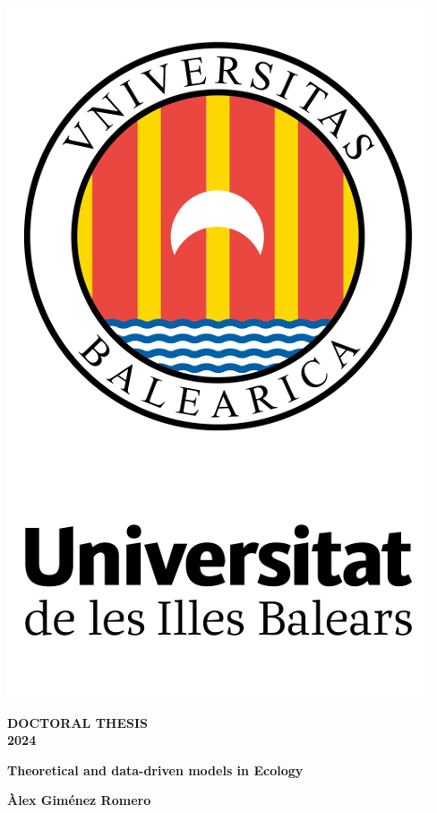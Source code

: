 \begin{titlepage}
    	\large

        \begin{center}
            \sffamily
            \includegraphics[width=.35\textwidth]{Figs/uib.png}
        
            \vspace*{.05\textheight}

			{\Huge\bfseries DOCTORAL THESIS} \\
			{\Large \bfseries 2024}

            \vspace*{.15\textheight}

			\begingroup
				{\Huge\bfseries Theoretical and data-driven models in Ecology \par}
			\endgroup

            \vfill

            {\Large \bfseries Àlex Giménez Romero}
        \end{center}
\end{titlepage}